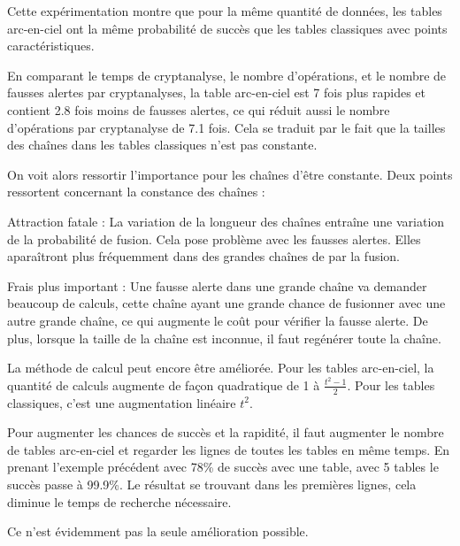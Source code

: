 	\bigskip

	Cette expérimentation montre que pour la même quantité de données, les tables arc-en-ciel ont la même probabilité de succès que les tables classiques avec points caractéristiques.

	\bigskip

	En comparant le temps de cryptanalyse, le nombre d'opérations, et le nombre de fausses alertes par cryptanalyses, la table arc-en-ciel est 7 fois plus rapides et contient 2.8 fois moins de fausses alertes, ce qui réduit aussi le nombre d'opérations par cryptanalyse de 7.1 fois. Cela se traduit par le fait que la tailles des chaînes dans les tables classiques n'est pas constante.

	\bigskip

	On voit alors ressortir l'importance pour les chaînes d'être constante. Deux points ressortent concernant la constance des chaînes\cite{Oech03} :

	\bi
		\item Attraction fatale : La variation de la longueur des chaînes entraîne une variation de la probabilité de fusion. Cela pose problème avec les fausses alertes. Elles aparaîtront plus fréquemment dans des grandes chaînes de par la fusion.
		\item Frais plus important : Une fausse alerte dans une grande chaîne va demander beaucoup de calculs, cette chaîne ayant une grande chance de fusionner avec une autre grande chaîne, ce qui augmente le coût pour vérifier la fausse alerte. De plus, lorsque la taille de la chaîne est inconnue, il faut regénérer toute la chaîne.
	\ei

	\bigskip

	La méthode de calcul peut encore être améliorée. Pour les tables arc-en-ciel, la quantité de calculs augmente de façon quadratique de 1 à $\frac{t^2-1}{2}$. Pour les tables classiques, c'est une augmentation linéaire $t^2$.

	\bigskip

	Pour augmenter les chances de succès et la rapidité, il faut augmenter le nombre de tables arc-en-ciel et regarder les lignes de toutes les tables en même temps. En prenant l'exemple précédent avec 78\% de succès avec une table, avec 5 tables le succès passe à 99.9\%. Le résultat se trouvant dans les premières lignes, cela diminue le temps de recherche nécessaire.

	Ce n'est évidemment pas la seule amélioration possible.

\endinput{}
